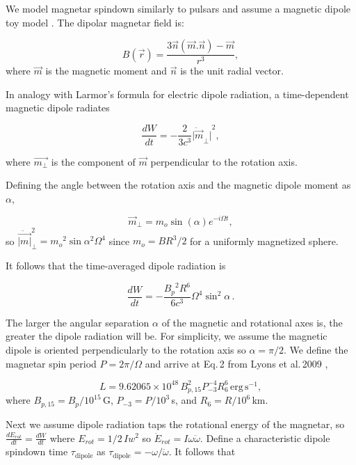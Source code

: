 \documentclass{article}
\begin{document}
We model magnetar spindown similarly to pulsars and assume a magnetic dipole toy model \cite{Rosswog:2007ap}. The dipolar magnetar field is:

\begin{equation} B(\vec{r})=\frac{3\vec{n}(\vec{m}.\vec{n})-\vec{m}}{r^3}, \end{equation}
where $\vec{m}$ is the magnetic moment and $\vec{n}$ is the unit radial vector.

In analogy with Larmor's formula for electric dipole radiation, a time-dependent magnetic dipole radiates

\begin{equation}
\frac{dW}{dt} = -\frac{2}{3c^3} {\ddot{|\vec{m}}_\perp|}^2,
\end{equation}

where $\vec{m_\perp}$ is the component of $\vec{m}$ perpendicular to the rotation axis.

Defining the angle between the rotation axis and the magnetic dipole moment as $\alpha$,

\begin{equation}\vec{m}_\perp = m_o  \sin({\alpha}) e^{-i\Omega t},\end{equation}
so $\ddot{\vec{|m|}}_\perp^2 = {m_o}^2 \sin{\alpha}^2 \Omega^4$
since $m_o = B R^3/2$ for a uniformly magnetized sphere.

It follows that the time-averaged dipole radiation is

\begin{equation} \label{eq:lumin}\frac{dW}{dt} = -\frac{{B_p}^2 R^6}{6c^3} \Omega^4 \sin^2{\alpha}\,.\end{equation}

The larger the angular separation $\alpha$ of the magnetic and rotational axes is, the greater the dipole radiation will be. For simplicity, we assume the magnetic dipole is oriented perpendicularly to the rotation axis so $\alpha=\pi/2$. We define the magnetar spin period $P= 2\pi/\Omega$ and arrive at Eq.\,2 from Lyons et al.\,2009 \cite{Lyons:2009ka},

\begin{equation} \label{eq:lum} L  = 9.62065 \times 10^{48}\, B^2_{p,15} P^{-4}_{-3} R^6_6\,\mathrm{erg \,s^{-1}},\end{equation}
where $B_{p,15} = B_p/10^{15}$\,G, $P_{-3}=P/10^3$\,s, and $R_6=R/10^6$\,km.

Next we assume dipole radiation taps the rotational energy of the magnetar, so $\frac{dE_{rot}}{dt} = \frac{dW}{dt}$ where $E_{rot} = 1/2\, I w^2$ so $\ddot{E}_{rot} = I \omega \ddot{\omega}$. Define a characteristic dipole spindown time $\tau_{\mathrm{dipole}}$ as $\tau_{\mathrm{dipole}} = - \omega/\ddot{\omega}$.
It follows that
\end{document}
